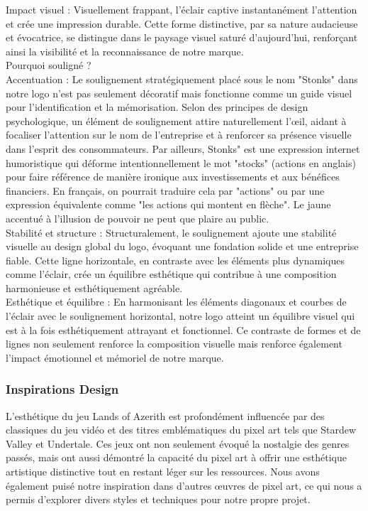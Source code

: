 Impact visuel : Visuellement frappant, l'éclair captive instantanément l'attention et crée une impression durable. Cette forme distinctive, par sa nature audacieuse et évocatrice, se distingue dans le paysage visuel saturé d'aujourd'hui, renforçant ainsi la visibilité et la reconnaissance de notre marque.
\\

Pourquoi souligné ?
\\

Accentuation : Le soulignement stratégiquement placé sous le nom "Stonks" dans notre logo n'est pas seulement décoratif mais fonctionne comme un guide visuel pour l'identification et la mémorisation. Selon des principes de design psychologique, un élément de soulignement attire naturellement l'œil, aidant à focaliser l'attention sur le nom de l'entreprise et à renforcer sa présence visuelle dans l'esprit des consommateurs. Par ailleurs, Stonks" est une expression internet humoristique qui déforme intentionnellement le mot "stocks" (actions en anglais) pour faire référence de manière ironique aux investissements et aux bénéfices financiers. En français, on pourrait traduire cela par "actions" ou par une expression équivalente comme "les actions qui montent en flèche". Le jaune accentué à l’illusion de pouvoir ne peut que plaire au public.
\\

Stabilité et structure : Structuralement, le soulignement ajoute une stabilité visuelle au design global du logo, évoquant une fondation solide et une entreprise fiable. Cette ligne horizontale, en contraste avec les éléments plus dynamiques comme l'éclair, crée un équilibre esthétique qui contribue à une composition harmonieuse et esthétiquement agréable.
\\

Esthétique et équilibre : En harmonisant les éléments diagonaux et courbes de l'éclair avec le soulignement horizontal, notre logo atteint un équilibre visuel qui est à la fois esthétiquement attrayant et fonctionnel. Ce contraste de formes et de lignes non seulement renforce la composition visuelle mais renforce également l'impact émotionnel et mémoriel de notre marque.


\subsubsection{Inspirations Design}

L'esthétique du jeu Lands of Azerith est profondément influencée par des classiques du jeu vidéo et des titres emblématiques du pixel art tels que Stardew Valley et Undertale.
Ces jeux ont non seulement évoqué la nostalgie des genres passés, mais ont aussi démontré la capacité du pixel art à offrir une esthétique artistique distinctive tout en restant léger sur les ressources.
Nous avons également puisé notre inspiration dans d'autres œuvres de pixel art, ce qui nous a permis d'explorer divers styles et techniques pour notre propre projet.

